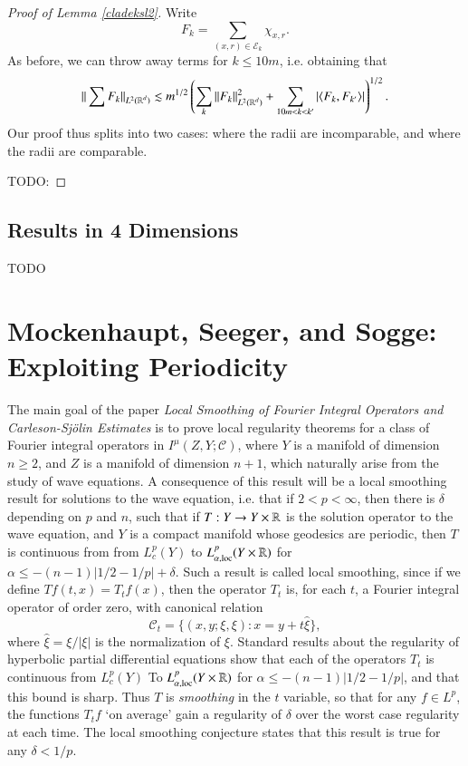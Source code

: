 \begin{proof} [Proof of Lemma \ref{cladeksl2}]
    Write
    \[ F_k = \sum_{(x,r) \in \mathcal{E}_k} \chi_{x,r}. \]
    As before, we can throw away terms for $k \leq 10 m$, i.e. obtaining that
    \[ \| \sum F_k \|_{L^2(\operatorname{\mathbb{R}}^d)} \lesssim m^{1/2} \left( \sum_k \| F_k \|_{L^2(\operatorname{\mathbb{R}}^d)}^2 + \sum_{10m < k < k'} |\langle F_k, F_{k'} \rangle| \right)^{1/2}. \]
    Our proof thus splits into two cases: where the radii are incomparable, and where the radii are comparable.

    TODO:
\end{proof}

\section{Results in 4 Dimensions}

TODO





\chapter[MSS: Exploiting Periodicity]{Mockenhaupt, Seeger, and Sogge: Exploiting Periodicity}

The main goal of the paper \emph{Local Smoothing of Fourier Integral Operators and {C}arleson-{S}j\"{o}lin Estimates} is to prove local regularity theorems for a class of Fourier integral operators in $I^\mu(Z,Y;\mathcal{C})$, where $Y$ is a manifold of dimension $n \geq 2$, and $Z$ is a manifold of dimension $n+1$, which naturally arise from the study of wave equations. A consequence of this result will be a local smoothing result for solutions to the wave equation, i.e. that if $2 < p < \infty$, then there is $\delta$ depending on $p$ and $n$, such that if $T: Y \to Y \times \operatorname{\mathbb{R}}$ is the solution operator to the wave equation, and $Y$ is a compact manifold whose geodesics are periodic, then $T$ is continuous from from $L^p_c(Y)$ to $L^p_{\alpha,\text{loc}}(Y \times \operatorname{\mathbb{R}})$ for $\alpha \leq -(n-1)|1/2 - 1/p| + \delta$. Such a result is called local smoothing, since if we define $Tf(t,x) = T_tf(x)$, then the operator $T_t$ is, for each $t$, a Fourier integral operator of order zero, with canonical relation
%
\[ \mathcal{C}_t = \{ (x,y;\xi,\xi) : x = y + t \widehat{\xi} \}, \]
%
where $\widehat{\xi} = \xi / |\xi|$ is the normalization of $\xi$. Standard results about the regularity of hyperbolic partial differential equations show that each of the operators $T_t$ is continuous from $L^p_c(Y)$ To $L^p_{\alpha,\text{loc}}(Y \times \operatorname{\mathbb{R}})$ for $\alpha \leq -(n-1)|1/2 - 1/p|$, and that this bound is sharp. Thus $T$ is \emph{smoothing} in the $t$ variable, so that for any $f \in L^p$, the functions $T_t f$ `on average' gain a regularity of $\delta$ over the worst case regularity at each time. The local smoothing conjecture states that this result is true for any $\delta < 1/p$.


